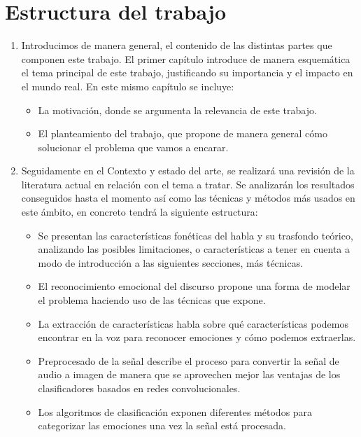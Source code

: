 \documentclass[11pt,a4paper,spanish]{book}
\begin{document}
	\section{Estructura del trabajo}
	\begin{enumerate}
		\item Introducimos de manera general, el contenido de las distintas partes que componen este trabajo.
		El primer capítulo introduce de manera esquemática el tema principal de este trabajo, justificando su importancia y el impacto en el mundo real. En este mismo capítulo se incluye:
		\begin{itemize}
			\item La motivación, donde se argumenta la relevancia de este trabajo.
			\item El planteamiento del trabajo, que propone de manera general cómo solucionar el problema que vamos a encarar.
		\end{itemize}
	
		\item Seguidamente en el Contexto y estado del arte, se realizará una revisión de la literatura actual en relación con el tema a tratar. Se analizarán los resultados conseguidos hasta el momento así como las técnicas y métodos más usados en este ámbito, en concreto tendrá la siguiente estructura:
		\begin{itemize}
			\item Se presentan las características fonéticas del habla y su trasfondo teórico, analizando las posibles limitaciones, o características a tener en cuenta a modo de introducción a las siguientes secciones, más técnicas.
			
			\item El reconocimiento emocional del discurso propone una forma de modelar el problema haciendo uso de las técnicas que expone.
			
			\item La extracción de características habla sobre qué características podemos encontrar en la voz para reconocer emociones y cómo podemos extraerlas.
			
			\item Preprocesado de la señal describe el proceso para convertir la señal de audio a imagen de manera que se aprovechen mejor las ventajas de los clasificadores basados en redes convolucionales.
			
			\item Los algoritmos de clasificación exponen diferentes métodos para categorizar las emociones una vez la señal está procesada.
			

\end{itemize}
\end{enumerate}
\end{document}
